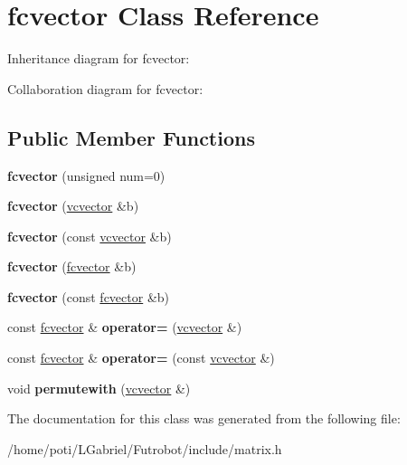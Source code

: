 \hypertarget{classfcvector}{}\section{fcvector Class Reference}
\label{classfcvector}


Inheritance diagram for fcvector\+:


Collaboration diagram for fcvector\+:
\subsection*{Public Member Functions}
\begin{DoxyCompactItemize}
\item 
{\bfseries fcvector} (unsigned num=0)\hypertarget{classfcvector_a54b8b89d460b2acf04373838d2af0285}{}\label{classfcvector_a54b8b89d460b2acf04373838d2af0285}

\item 
{\bfseries fcvector} (\hyperlink{classvcvector}{vcvector} \&b)\hypertarget{classfcvector_acbce681c518ec5eb8197d4d6b35c3cbc}{}\label{classfcvector_acbce681c518ec5eb8197d4d6b35c3cbc}

\item 
{\bfseries fcvector} (const \hyperlink{classvcvector}{vcvector} \&b)\hypertarget{classfcvector_a09fc79dd0399d712f03653955a916559}{}\label{classfcvector_a09fc79dd0399d712f03653955a916559}

\item 
{\bfseries fcvector} (\hyperlink{classfcvector}{fcvector} \&b)\hypertarget{classfcvector_a67522edad9649180847ae30f80599e7f}{}\label{classfcvector_a67522edad9649180847ae30f80599e7f}

\item 
{\bfseries fcvector} (const \hyperlink{classfcvector}{fcvector} \&b)\hypertarget{classfcvector_a492250e95565d07067a1316beda60ac8}{}\label{classfcvector_a492250e95565d07067a1316beda60ac8}

\item 
const \hyperlink{classfcvector}{fcvector} \& {\bfseries operator=} (\hyperlink{classvcvector}{vcvector} \&)\hypertarget{classfcvector_ade00b160541f63d817dfd31c6b414de2}{}\label{classfcvector_ade00b160541f63d817dfd31c6b414de2}

\item 
const \hyperlink{classfcvector}{fcvector} \& {\bfseries operator=} (const \hyperlink{classvcvector}{vcvector} \&)\hypertarget{classfcvector_ad4a54fa0e29bf368bbd4c5323d31622b}{}\label{classfcvector_ad4a54fa0e29bf368bbd4c5323d31622b}

\item 
void {\bfseries permutewith} (\hyperlink{classvcvector}{vcvector} \&)\hypertarget{classfcvector_a8ad7a60cffe8b8a04863bf74f58fb8f9}{}\label{classfcvector_a8ad7a60cffe8b8a04863bf74f58fb8f9}

\end{DoxyCompactItemize}


The documentation for this class was generated from the following file\+:\begin{DoxyCompactItemize}
\item 
/home/poti/\+L\+Gabriel/\+Futrobot/include/matrix.\+h\end{DoxyCompactItemize}
